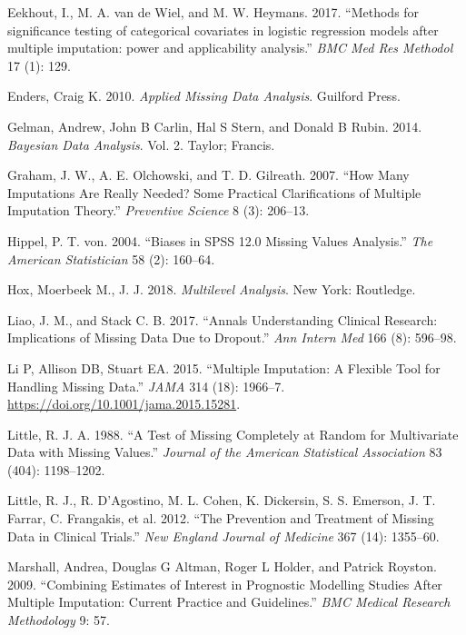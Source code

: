 \documentclass[
]{book}
\begin{document}
\leavevmode\hypertarget{ref-Eekhout2017}{}%
Eekhout, I., M. A. van de Wiel, and M. W. Heymans. 2017. ``Methods for
significance testing of categorical covariates in logistic regression
models after multiple imputation: power and applicability analysis.''
\emph{BMC Med Res Methodol} 17 (1): 129.

\leavevmode\hypertarget{ref-enders2010applied}{}%
Enders, Craig K. 2010. \emph{Applied Missing Data Analysis}. Guilford
Press.

\leavevmode\hypertarget{ref-gelman2014bayesian}{}%
Gelman, Andrew, John B Carlin, Hal S Stern, and Donald B Rubin. 2014.
\emph{Bayesian Data Analysis}. Vol. 2. Taylor; Francis.

\leavevmode\hypertarget{ref-Graham2007}{}%
Graham, J. W., A. E. Olchowski, and T. D. Gilreath. 2007. ``How Many
Imputations Are Really Needed? Some Practical Clarifications of Multiple
Imputation Theory.'' \emph{Preventive Science} 8 (3): 206--13.

\leavevmode\hypertarget{ref-hippel2004}{}%
Hippel, P. T. von. 2004. ``Biases in SPSS 12.0 Missing Values
Analysis.'' \emph{The American Statistician} 58 (2): 160--64.

\leavevmode\hypertarget{ref-hox2018multilevelanalysis}{}%
Hox, Moerbeek M., J. J. 2018. \emph{Multilevel Analysis}. New York:
Routledge.

\leavevmode\hypertarget{ref-Liao2017}{}%
Liao, J. M., and Stack C. B. 2017. ``Annals Understanding Clinical
Research: Implications of Missing Data Due to Dropout.'' \emph{Ann
Intern Med} 166 (8): 596--98.

\leavevmode\hypertarget{ref-Li2015}{}%
Li P, Allison DB, Stuart EA. 2015. ``Multiple Imputation: A Flexible
Tool for Handling Missing Data.'' \emph{JAMA} 314 (18): 1966--7.
\url{https://doi.org/10.1001/jama.2015.15281}.

\leavevmode\hypertarget{ref-Little1988}{}%
Little, R. J. A. 1988. ``A Test of Missing Completely at Random for
Multivariate Data with Missing Values.'' \emph{Journal of the American
Statistical Association} 83 (404): 1198--1202.

\leavevmode\hypertarget{ref-little2012prevention}{}%
Little, R. J., R. D'Agostino, M. L. Cohen, K. Dickersin, S. S. Emerson,
J. T. Farrar, C. Frangakis, et al. 2012. ``The Prevention and Treatment
of Missing Data in Clinical Trials.'' \emph{New England Journal of
Medicine} 367 (14): 1355--60.

\leavevmode\hypertarget{ref-Marshall2009MedResMeth}{}%
Marshall, Andrea, Douglas G Altman, Roger L Holder, and Patrick Royston.
2009. ``Combining Estimates of Interest in Prognostic Modelling Studies
After Multiple Imputation: Current Practice and Guidelines.'' \emph{BMC
Medical Research Methodology} 9: 57.
\end{document}
